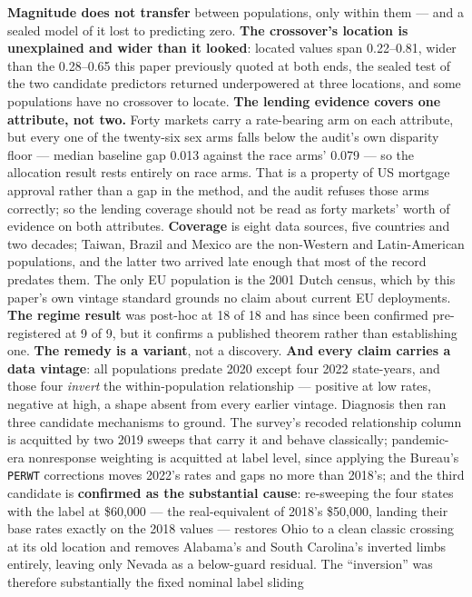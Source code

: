 \documentclass[9pt,conference]{IEEEtran}
\begin{document}
\textbf{Magnitude does not transfer} between populations, only within them --- and a sealed
model of it lost to predicting zero. \textbf{The crossover's location is unexplained and wider than it looked}: located values span 0.22--0.81, wider than the 0.28--0.65 this paper previously quoted at both ends, the sealed test of the two candidate
predictors returned underpowered at three locations, and some populations have no crossover
to locate. \textbf{The lending evidence covers one attribute, not two.} Forty markets carry a
rate-bearing arm on each attribute, but every one of the twenty-six sex arms falls below the audit's own
disparity floor --- median baseline gap 0.013 against the race arms' 0.079 --- so the
allocation result rests entirely on race arms. That is a property of US mortgage approval
rather than a gap in the method, and the audit refuses those arms correctly; so the lending coverage should not be read as forty
markets' worth of evidence on both attributes.
\textbf{Coverage} is eight data sources, five
countries and two decades; Taiwan, Brazil and Mexico are the non-Western and
Latin-American populations, and the latter two arrived late enough that most of the
record predates them. The only EU population is the 2001 Dutch census, which by this paper's own
vintage standard grounds no claim about current EU deployments. \textbf{The regime result} was post-hoc at 18 of 18 and has since been confirmed
pre-registered at 9 of 9, but it confirms a published theorem rather than establishing one.
\textbf{The remedy is a variant}, not a discovery. \textbf{And every claim carries a data
vintage}: all populations predate 2020 except four 2022 state-years, and those four
\emph{invert} the within-population relationship --- positive at low rates, negative at
high, a shape absent from every earlier vintage. Diagnosis then ran three candidate
mechanisms to ground. The survey's recoded relationship column is acquitted by two 2019
sweeps that carry it and behave classically; pandemic-era nonresponse weighting is
acquitted at label level, since applying the Bureau's \texttt{PERWT} corrections moves
2022's rates and gaps no more than 2018's; and the third candidate is \textbf{confirmed as
the substantial cause}: re-sweeping the four states with the label at \$60{,}000 --- the
real-equivalent of 2018's \$50{,}000, landing their base rates exactly on the 2018 values
--- restores Ohio to a clean classic crossing at its old location and removes Alabama's
and South Carolina's inverted limbs entirely, leaving only Nevada as a below-guard
residual. The ``inversion'' was therefore substantially the fixed nominal label sliding
\end{document}
